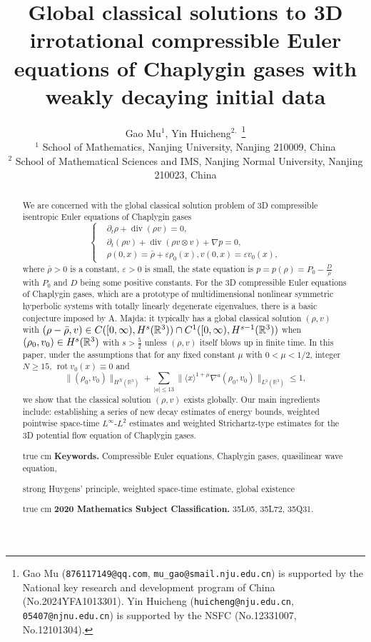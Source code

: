 \documentclass[11pt,twoside]{article}
\title{Global classical solutions to 3D  irrotational compressible Euler equations of Chaplygin gases with weakly decaying initial data}
\def\f{\frac}
\def\p{\partial}
\def\ve{\varepsilon}
\DeclareMathOperator{\Div}{div}
\DeclareMathOperator{\rot}{rot}
\theoremstyle{plain}
\theoremstyle{definition}
\theoremstyle{assumption}
\numberwithin{equation}{section}
\begin{document}
	\author{
		Gao Mu$^{1}$, \quad Yin Huicheng$^{2,}$
		\footnote{Gao Mu (\texttt{876117149@qq.com}, \texttt{mu\_gao@smail.nju.edu.cn}) is supported by the National key research and development program of China (No.2024YFA1013301).
			Yin Huicheng (\texttt{huicheng@nju.edu.cn}, \texttt{05407@njnu.edu.cn}) is supported by the NSFC (No.12331007, No.12101304).}
		\\[0.5cm]
		\small
		$^{1}$ School of Mathematics, Nanjing University, Nanjing 210009, China\\
		\small
		$^{2}$ School of Mathematical Sciences and IMS, Nanjing Normal University, Nanjing 210023, China
	}
	\date{}
	\maketitle
	
	\thispagestyle{empty}
	
	
	\begin{abstract}
We are concerned with the global classical solution problem of 3D compressible isentropic Euler equations of Chaplygin gases
	\begin{equation*}
		\left\{
		\begin{aligned}
			&\p_t\rho+\Div(\rho v)=0,\\
			&\p_t(\rho v)+\Div(\rho v \otimes v)+\nabla p=0,\\
&\rho(0,x)=\bar\rho+\ve\rho_0(x), v(0,x)=\ve v_0(x),
		\end{aligned}
		\right.
	\end{equation*}
	where $\bar\rho>0$
is a constant, $\ve>0$ is small, the state equation is $p=p(\rho)=P_0-\frac{D}{\rho}$ with $P_0$ and $D$ being
some positive constants. For the  3D compressible Euler equations of Chaplygin gases,
which are a prototype of multidimensional nonlinear symmetric hyperbolic systems with totally linearly degenerate eigenvalues, there is
a basic conjecture imposed by A. Majda: it typically has a global classical solution $(\rho, v)$ with $(\rho-\bar\rho, v)\in C([0,\infty), H^s(\Bbb R^3))
\cap C^1([0,\infty), H^{s-1}(\Bbb R^3))$ when
$(\rho_0, v_0)\in H^s(\Bbb R^3)$ with $s>\f52$ unless $(\rho, v)$  itself blows up in finite
time. In this paper, under the assumptions that for any fixed constant $\mu$ with $0<\mu<1/2$, integer $N\ge 15$, $\rot v_0(x)\equiv 0$ and
		\[
		\|(\rho_0, v_0)\|_{H^{N}(\mathbb{R}^3)}+\sum_{|a|\leq 13}
		\|\langle x\rangle^{1+\mu}
		\nabla^a(\rho_0,v_0)\|_{L^2(\mathbb{R}^3)} \le 1,
		\]
we show that the classical solution $(\rho, v)$ exists globally. Our main ingredients include: establishing  a series of new
decay estimates of energy bounds, weighted  pointwise space-time $L^\infty$-$L^2$ estimates and weighted Strichartz-type estimates
for the 3D potential flow equation of Chaplygin gases.
		
		 true cm
		\noindent
		\textbf{Keywords.} Compressible Euler equations, Chaplygin gases, quasilinear wave equation,

\qquad\quad strong Huygens' principle, weighted space-time estimate, global existence
		
		 true cm
		\noindent
		\textbf{2020 Mathematics Subject Classification.}  35L05, 35L72, 35Q31.
	\end{abstract}
	
\end{document}
